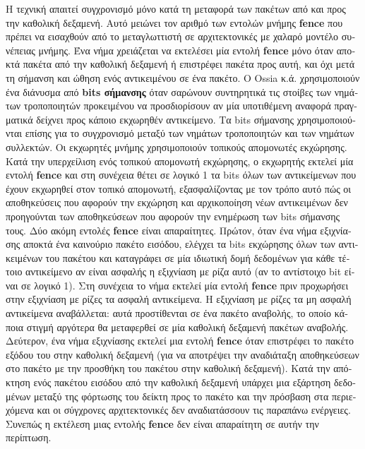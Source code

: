 \begin{greek}
Η τεχνική απαιτεί συγχρονισμό μόνο κατά τη μεταφορά των πακέτων
από και προς την καθολική δεξαμενή. Αυτό μειώνει τον αριθμό
των εντολών μνήμης \textbf{fence} που πρέπει να εισαχθούν από
το μεταγλωττιστή σε αρχιτεκτονικές με χαλαρό μοντέλο συνέπειας
μνήμης. Ένα νήμα χρειάζεται να εκτελέσει μία εντολή \textbf{fence}
μόνο όταν αποκτά πακέτα από την καθολική δεξαμενή ή επιστρέφει
πακέτα προς αυτή, και όχι μετά τη σήμανση και ώθηση ενός αντικειμένου
σε ένα πακέτο. Ο Ossia κ.ά. χρησιμοποιούν ένα διάνυσμα από
\textbf{bits σήμανσης} όταν σαρώνουν συντηρητικά τις στοίβες
των νημάτων τροποποιητών προκειμένου να προσδιορίσουν αν μία
υποτιθέμενη αναφορά πραγματικά δείχνει προς κάποιο εκχωρηθέν
αντικείμενο. Τα bits σήμανσης χρησιμοποιούνται επίσης για το
συγχρονισμό μεταξύ των νημάτων τροποποιητών και των νημάτων
συλλεκτών. Οι εκχωρητές μνήμης χρησιμοποιούν τοπικούς απομονωτές
εκχώρησης. Κατά την υπερχείλιση ενός τοπικού απομονωτή εκχώρησης,
ο εκχωρητής εκτελεί μία εντολή \textbf{fence} και στη συνέχεια
θέτει σε λογικό 1 τα bits όλων των αντικείμενων που έχουν
εκχωρηθεί στον τοπικό απομονωτή, εξασφαλίζοντας με τον τρόπο
αυτό πώς οι αποθηκεύσεις που αφορούν την εκχώρηση και αρχικοποίηση
νέων αντικειμένων δεν προηγούνται των αποθηκεύσεων που αφορούν
την ενημέρωση των bits σήμανσης τους. Δύο ακόμη εντολές \textbf{fence}
είναι απαραίτητες. Πρώτον, όταν ένα νήμα εξιχνίασης αποκτά ένα
καινούριο πακέτο εισόδου, ελέγχει τα bits εκχώρησης όλων των
αντικειμένων του πακέτου και καταγράφει σε μία ιδιωτική δομή
δεδομένων για κάθε τέτοιο αντικείμενο αν είναι ασφαλής η
εξιχνίαση με ρίζα αυτό (αν το αντίστοιχο bit είναι σε λογικό
1). Στη συνέχεια το νήμα εκτελεί μία εντολή \textbf{fence}
πριν προχωρήσει στην εξιχνίαση με ρίζες τα ασφαλή αντικείμενα. 
Η εξιχνίαση με ρίζες τα μη ασφαλή αντικείμενα αναβάλλεται:
αυτά προστίθενται σε ένα πακέτο αναβολής, το οποίο κάποια
στιγμή αργότερα θα μεταφερθεί σε μία καθολική δεξαμενή
πακέτων αναβολής. Δεύτερον, ένα νήμα εξιχνίασης εκτελεί
μια εντολή \textbf{fence} όταν επιστρέφει το πακέτο εξόδου
του στην καθολική δεξαμενή (για να αποτρέψει την αναδιάταξη
αποθηκεύσεων στο πακέτο με την προσθήκη του πακέτου στην
καθολική δεξαμενή). Κατά την απόκτηση ενός πακέτου εισόδου
από την καθολική δεξαμενή υπάρχει μια εξάρτηση δεδομένων
μεταξύ της φόρτωσης του δείκτη προς το πακέτο και την πρόσβαση
στα περιεχόμενα και οι σύγχρονες αρχιτεκτονικές δεν αναδιατάσσουν
τις παραπάνω ενέργειες. Συνεπώς η εκτέλεση μιας εντολής
\textbf{fence} δεν είναι απαραίτητη σε αυτήν την περίπτωση.


\end{greek}
